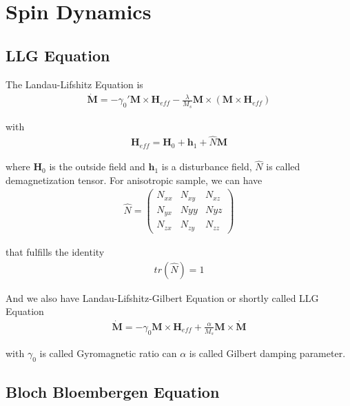 \section{Spin Dynamics}
\label{sec: spin dynamcis}
\subsection{LLG Equation}

The Landau-Lifshitz Equation is 
\begin{align}
  \dot{\pmb{M}}=-\gamma_0' \pmb{M}\times \pmb{H}_{eff}-\frac{\lambda}{M_s}\pmb{M}\times(\pmb{M}\times \pmb{H}_{eff})
  \label{equ: landau lifshitz equation}
\end{align}

with 
\begin{align}
  \pmb{H}_{eff}=\pmb{H}_0+\pmb{h}_1+\hat{N}\pmb{M}
\end{align}

where $\pmb{H}_0$ is the outside field and $\pmb{h}_1$ is a disturbance field, $\hat{N}$ is called demagnetization tensor. For anisotropic sample, we can have 
\begin{align}
  \hat{N}=\begin{pmatrix}
  	N_{xx}&N_{xy}&N_{xz}\\
  	N_{yx}&N{yy}&N{yz}\\
  	N_{zx}&N_{zy}&N_{zz}
  \end{pmatrix}
\end{align}

that fulfills the identity
\begin{align*}
	tr(\hat{N})=1
\end{align*}

And we also have Landau-Lifshitz-Gilbert Equation or shortly called LLG Equation
\begin{align}
  \dot{\pmb{M}}=-\gamma_0 \pmb{M}\times \pmb{H}_{eff}+\frac{\alpha}{M_s}\pmb{M}\times \dot{\pmb{M}}
  \label{equ: llg equation}
\end{align}

with $\gamma_0$ is called Gyromagnetic ratio can $\alpha$ is called Gilbert damping parameter. 

\subsection{Bloch Bloembergen Equation}
\label{sec: bloch bloembergen equation}










